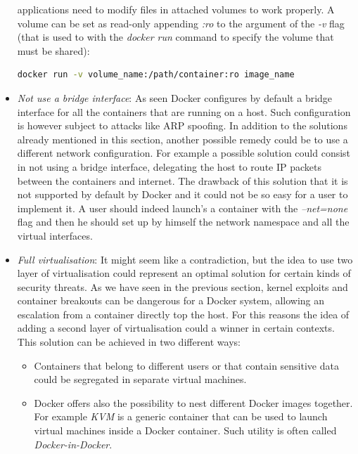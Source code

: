 \documentclass[a4paper,12pt]{article}
\begin{document}
\begin{itemize}
  applications need to modify files in attached volumes to work properly. A
  volume can be set as read-only appending \textit{:ro} to the argument of the
  \textit{-v} flag (that is used to with the \textit{docker run} command to
  specify the volume that must be shared): 
  \begin{lstlisting}[language=bash,breaklines]
    docker run -v volume_name:/path/container:ro image_name
  \end{lstlisting}
  \item \textit{Not use a bridge interface}: As seen Docker configures by
  default a bridge interface for all the containers that are running on a host.
  Such configuration is however subject to attacks like ARP spoofing. In
  addition to the solutions already mentioned in this section, another possible
  remedy could be to use a different network configuration. For example a
  possible solution could consist in not using a bridge interface, delegating
  the host to route IP packets between the containers and internet. The drawback
  of this solution that it is not supported by default by Docker and it could
  not be so easy for a user to implement it. A user should indeed launch's a
  container with the \textit{--net=none} flag and then he should set up by
  himself the network namespace and all the virtual interfaces.
  \item \textit{Full virtualisation}: It might seem like a contradiction, but
  the idea to use two layer of virtualisation could represent an optimal
  solution for certain kinds of security threats. As we have seen in the
  previous section, kernel exploits and container breakouts can be
  dangerous for a Docker system, allowing an escalation from a container
  directly top the host. For this reasons the idea of adding a second layer of
  virtualisation could a winner in certain contexts. This solution can be
  achieved in two different ways: 
  \begin{itemize}
    \item Containers that belong to different users or that contain sensitive
    data could be segregated in separate virtual machines. 
    \item Docker offers also the possibility to nest different Docker images
    together. For example \textit{KVM} \cite{kvm} is a generic container that
    can be used to launch virtual machines inside a Docker container. Such
    utility is often called \textit{Docker-in-Docker}.
  \end{itemize} 
\end{itemize}
\end{document}
